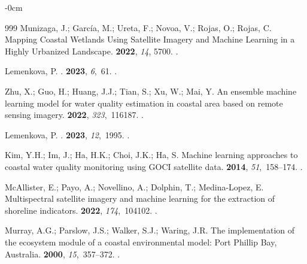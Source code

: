 \documentclass[jmse,article,accept,pdftex,oneauthor]{Definitions/mdpi}
\begin{document}
\begin{adjustwidth}{-\extralength}{0cm}
\begin{thebibliography}{999}
Munizaga, J.; García, M.; Ureta, F.; Novoa, V.; Rojas, O.; Rojas, C.
\newblock Mapping Coastal Wetlands Using Satellite Imagery and Machine Learning
  in a Highly Urbanized Landscape.
 {\bf 2022}, {\em 14}, 5700.
.

Lemenkova, P.
.
 {\bf 2023}, {\em 6},~61.
.

Zhu, X.; Guo, H.; Huang, J.J.; Tian, S.; Xu, W.; Mai, Y.
\newblock An ensemble machine learning model for water quality estimation in
  coastal area based on remote sensing imagery.
 {\bf 2022}, {\em
  323},~116187.
.

Lemenkova, P.
.
 {\bf 2023}, {\em 12},~1995.
.

Kim, Y.H.; Im, J.; Ha, H.K.; Choi, J.K.; Ha, S.
\newblock Machine learning approaches to coastal water quality monitoring using
  GOCI satellite data.
 {\bf 2014}, {\em 51},~158--174.
.

McAllister, E.; Payo, A.; Novellino, A.; Dolphin, T.; Medina-Lopez, E.
\newblock Multispectral satellite imagery and machine learning for the
  extraction of shoreline indicators.
 {\bf 2022}, {\em 174},~104102.
.

Murray, A.G.; Parslow, J.S.; Walker, S.J.; Waring, J.R.
\newblock The implementation of the ecosystem module of a coastal environmental
  model: Port Phillip Bay, Australia.
 {\bf 2000}, {\em
  15},~357--372.
.


\end{thebibliography}
\end{adjustwidth}
\end{document}

